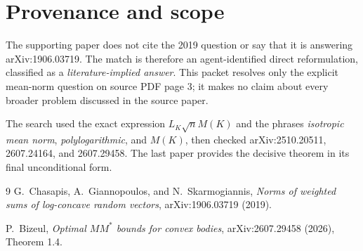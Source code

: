 \documentclass[11pt]{article}
\begin{document}
\section*{Provenance and scope}

The supporting paper does not cite the 2019 question or say that it is
answering arXiv:1906.03719.  The match is therefore an agent-identified direct
reformulation, classified as a \emph{literature-implied answer}.  This
packet resolves only the explicit mean-norm question on source PDF page 3;
it makes no claim about every broader problem discussed in the source paper.

The search used the exact expression $L_K\sqrt n M(K)$ and the phrases
\emph{isotropic mean norm}, \emph{polylogarithmic}, and \emph{$M(K)$}, then
checked arXiv:2510.20511, 2607.24164, and 2607.29458.  The last paper provides
the decisive theorem in its final unconditional form.

\begin{thebibliography}{9}
G.~Chasapis, A.~Giannopoulos, and N.~Skarmogiannis,
\emph{Norms of weighted sums of log-concave random vectors},
arXiv:1906.03719 (2019).

P.~Bizeul,
\emph{Optimal $MM^*$ bounds for convex bodies},
arXiv:2607.29458 (2026), Theorem 1.4.
\end{thebibliography}
\end{document}
